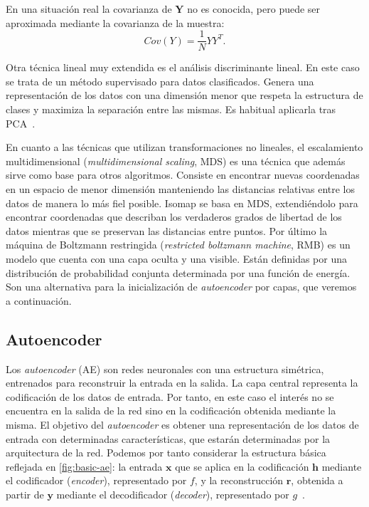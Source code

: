 En una situación real la covarianza de $\textbf{Y}$ no es conocida, pero puede ser aproximada mediante la covarianza de la muestra: $$Cov(Y) = \frac{1}{N}YY^T.$$

Otra técnica lineal muy extendida es el análisis discriminante lineal. En este caso se trata de un método supervisado para datos clasificados. Genera una representación de los datos con una dimensión menor que respeta la estructura de clases y maximiza la separación entre las mismas. Es habitual aplicarla tras PCA~\cite{ye2005two}.

En cuanto a las técnicas que utilizan transformaciones no lineales, el escalamiento multidimensional (\textit{multidimensional scaling}, MDS) es una técnica que además sirve como base para otros algoritmos. Consiste en encontrar nuevas coordenadas en un espacio de menor dimensión manteniendo las distancias relativas entre los datos de manera lo más fiel posible. Isomap se basa en MDS, extendiéndolo para encontrar coordenadas que describan los verdaderos grados de libertad de los datos mientras que se preservan las distancias entre puntos. Por último la máquina de Boltzmann restringida (\textit{restricted boltzmann machine}, RMB) es un modelo que cuenta con una capa oculta y una visible. Están definidas por una distribución de probabilidad conjunta determinada por una función de energía. Son una alternativa para la inicialización de \textit{autoencoder} por capas, que veremos a continuación.

\subsection{Autoencoder}

Los \textit{autoencoder} (AE) son redes neuronales con una estructura simétrica, entrenados para reconstruir la entrada en la salida. La capa central representa la codificación de los datos de entrada. Por tanto, en este caso el interés no se encuentra en la salida de la red sino en la codificación obtenida mediante la misma. El objetivo del \textit{autoencoder} es obtener una representación de los datos de entrada con determinadas características, que estarán determinadas por la arquitectura de la red. Podemos por tanto considerar la estructura básica reflejada en \autoref{fig:basic-ae}: la entrada $\textbf{x}$ que se aplica en la codificación $\textbf{h}$ mediante el codificador (\textit{encoder}), representado por $f$, y la reconstrucción $\textbf{r}$, obtenida a partir de $\textbf{y}$ mediante el decodificador (\textit{decoder}), representado por $g$~\cite{goodfellow2016}.


